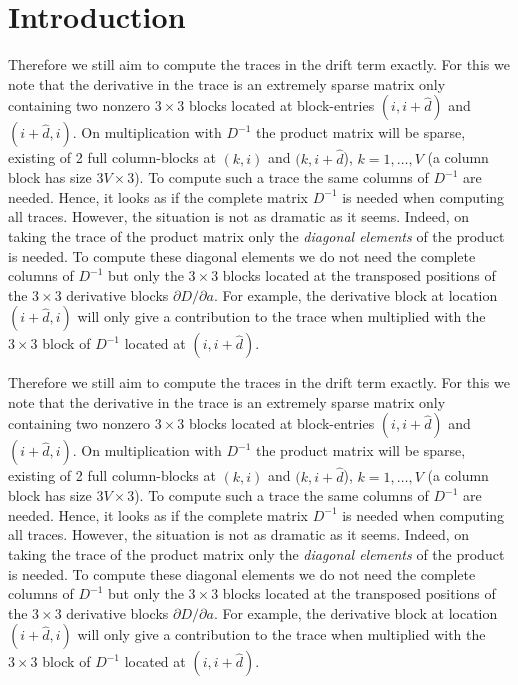 \documentclass{article}
\begin{document}
\section{Introduction}
\label{Intro}

Therefore we still aim to compute the traces in the drift term exactly. For this we note that the derivative in the trace is an extremely sparse matrix only containing two nonzero $3\times 3$ blocks located at block-entries $(i,i+\hat d)$ and $(i+\hat d,i)$. On multiplication with $D^{-1}$ the product matrix will be sparse, existing of 2 full column-blocks at $(k,i)$ and $(k,i+\hat d$), $k=1,\ldots,V$ (a column block has size $3V\times 3$). To compute such a trace the same columns of $D^{-1}$ are needed. Hence, it looks as if the complete matrix $D^{-1}$ is needed when computing all traces. However, the situation is not as dramatic as it seems. Indeed, on taking the trace of the product matrix only the \textit{diagonal elements} of the product is needed. To compute these diagonal elements we do not need the complete columns of $D^{-1}$ but only the $3\times 3$ blocks located at the transposed positions of the $3\times 3$ derivative blocks $\partial D/\partial a$. For example, the derivative block at location $(i+\hat d,i)$ will only give a contribution to the trace when multiplied with the $3\times 3$ block of $D^{-1}$ located at $(i, i+\hat d)$. 

Therefore we still aim to compute the traces in the drift term exactly.
For this we note that the derivative in the trace is an extremely sparse matrix only containing two nonzero $3\times 3$ blocks located at block-entries $(i,i+\hat d)$ and $(i+\hat d,i)$.
On multiplication with $D^{-1}$ the product matrix will be sparse, existing of 2 full column-blocks at $(k,i)$ and $(k,i+\hat d$), $k=1,\ldots,V$ (a column block has size $3V\times 3$).
To compute such a trace the same columns of $D^{-1}$ are needed. Hence, it looks as if the complete matrix $D^{-1}$ is needed when computing all traces.
 However, the situation is not as dramatic as it seems.
 Indeed, on taking the trace of the product matrix only the \textit{diagonal elements} of the product is needed.
 To compute these diagonal elements we do not need the complete columns of $D^{-1}$ but only the $3\times 3$ blocks located at the transposed positions of the $3\times 3$ derivative blocks $\partial D/\partial a$.
 For example, the derivative block at location $(i+\hat d,i)$ will only give a contribution to the trace when multiplied with the $3\times 3$ block of $D^{-1}$ located at $(i, i+\hat d)$. 
\end{document}
